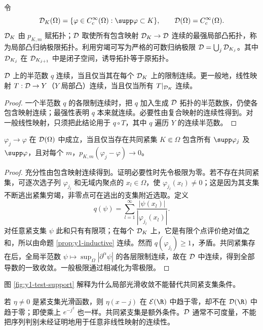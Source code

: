 令
\[
 \Test_K(\Omega)=\{\varphi\in C_c^\infty(\Omega):\supp\varphi\subset K\},\qquad
 \Test(\Omega)=C_c^\infty(\Omega).
\]
$\mathcal{D}_K$ 由 $p_{K,m}$ 赋拓扑；$\mathcal{D}$ 取使所有包含映射 $\mathcal{D}_K\to\mathcal{D}$ 连续的最强局部凸拓扑，称为局部凸归纳极限拓扑。利用穷竭可写为严格的可数归纳极限 $\mathcal{D}=\bigcup_j\mathcal{D}_{K_j}$。其中 $\mathcal{D}_{K_j}$ 在 $\mathcal{D}_{K_{j+1}}$ 中是闭子空间，诱导拓扑等于原拓扑。

\begin{proposition}[归纳极限的半范数判别]\label{prop:y1-inductive}
$\mathcal{D}$ 上的半范数 $q$ 连续，当且仅当其在每个 $\mathcal{D}_K$ 上的限制连续。更一般地，线性映射 $T:\mathcal{D}\to Y$（$Y$ 局部凸）连续，当且仅当所有 $T|_{\mathcal{D}_K}$ 连续。
\end{proposition}
\begin{proof}
一个半范数 $q$ 的各限制连续时，把 $q$ 加入生成 $\mathcal{D}$ 拓扑的半范数族，仍使各包含映射连续；最强性表明 $q$ 本来就连续。必要性由复合映射的连续性得到。对一般线性映射，只须把此结论用于 $q\circ T$，其中 $q$ 遍历 $Y$ 的连续半范数。
\end{proof}

\begin{theorem}[测试函数的序列收敛]\label{thm:y1-D-sequence}
$\varphi_j\to\varphi$ 在 $\mathcal{D}(\Omega)$ 中成立，当且仅当存在共同紧集 $K\Subset\Omega$ 包含所有 $\supp\varphi_j$ 及 $\supp\varphi$，且对每个 $m$，$p_{K,m}(\varphi_j-\varphi)\to0$。
\end{theorem}
\begin{proof}
充分性由包含映射连续得到。证明必要性时先令极限为零。若不存在共同紧集，可逐次选子列 $\varphi_{j_l}$ 和无域内聚点的 $x_l\in\Omega$，使 $\varphi_{j_l}(x_l)\ne0$；这是因为其支集不断逃出紧集穷竭，非零点可在逃出的支集附近选取。定义
\[
 q(\psi)=\sum_{l=1}^\infty
 \frac{|\psi(x_l)|}{|\varphi_{j_l}(x_l)|}.
\]
对任意紧支集 $\psi$ 此和只有有限项；在每个 $\mathcal{D}_K$ 上，它是有限个点评价绝对值之和，所以由命题 \ref{prop:y1-inductive} 连续。然而 $q(\varphi_{j_l})\ge1$，矛盾。共同紧集存在后，全局半范数 $\psi\mapsto\sup_\Omega|\partial^\alpha\psi|$ 的各层限制连续，故在 $\mathcal{D}$ 中连续，得到全部导数的一致收敛。一般极限通过相减化为零极限。
\end{proof}

图 \ref{fig:y1-test-support} 解释为什么局部光滑收敛不能替代共同紧支集条件。


\begin{pitfall}[局部收敛与测试函数收敛]
若 $\eta\ne0$ 是紧支集光滑函数，则 $\eta(x-j)$ 在 $\mathcal E(\R)$ 中趋于零，却不在 $\Test(\R)$ 中趋于零；即使乘上 $e^{-j^2}$ 也一样。共同紧支集是额外条件。$\mathcal{D}$ 通常不可度量，不能把序列判别未经证明地用于任意非线性映射的连续性。
\end{pitfall}

